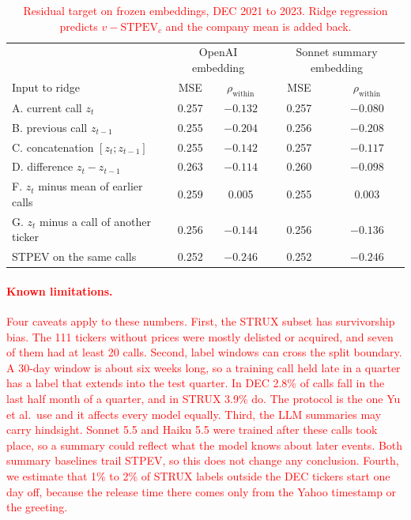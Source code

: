\documentclass{article}
\newcommand{\new}[1]{\textcolor{red}{#1}}
\begin{document}
\begin{table}[h]
\centering
\small
\begin{tabular}{lcccc}
\toprule
 & \multicolumn{2}{c}{OpenAI embedding} & \multicolumn{2}{c}{Sonnet summary embedding} \\
Input to ridge & MSE & $\rho_{\text{within}}$ & MSE & $\rho_{\text{within}}$ \\
\midrule
A. current call $z_t$ & 0.257 & $-0.132$ & 0.257 & $-0.080$ \\
B. previous call $z_{t-1}$ & 0.255 & $-0.204$ & 0.256 & $-0.208$ \\
C. concatenation $[z_t; z_{t-1}]$ & 0.255 & $-0.142$ & 0.257 & $-0.117$ \\
D. difference $z_t - z_{t-1}$ & 0.263 & $-0.114$ & 0.260 & $-0.098$ \\
F. $z_t$ minus mean of earlier calls & 0.259 & 0.005 & 0.255 & 0.003 \\
G. $z_t$ minus a call of another ticker & 0.256 & $-0.144$ & 0.256 & $-0.136$ \\
\midrule
STPEV on the same calls & 0.252 & $-0.246$ & 0.252 & $-0.246$ \\
\bottomrule
\end{tabular}
\caption{\new{Residual target on frozen embeddings, DEC 2021 to 2023. Ridge regression predicts $v-\mathrm{STPEV}_c$ and the company mean is added back.}}
\label{tab:m2}
\end{table}

\paragraph{\new{Known limitations.}}
\new{Four caveats apply to these numbers. First, the STRUX subset has survivorship bias. The 111 tickers without prices were mostly delisted or acquired, and seven of them had at least 20 calls. Second, label windows can cross the split boundary. A 30-day window is about six weeks long, so a training call held late in a quarter has a label that extends into the test quarter. In DEC 2.8\% of calls fall in the last half month of a quarter, and in STRUX 3.9\% do. The protocol is the one Yu et al.\ use and it affects every model equally. Third, the LLM summaries may carry hindsight. Sonnet 5.5 and Haiku 5.5 were trained after these calls took place, so a summary could reflect what the model knows about later events. Both summary baselines trail STPEV, so this does not change any conclusion. Fourth, we estimate that 1\% to 2\% of STRUX labels outside the DEC tickers start one day off, because the release time there comes only from the Yahoo timestamp or the greeting.}
\end{document}

